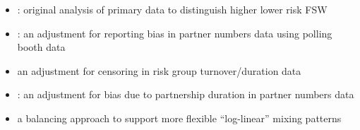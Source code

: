 \begin{itemize}
  \item{}:
  original analysis of primary data to distinguish higher \vs lower risk FSW
  \item{}:
  an adjustment for reporting bias in partner numbers data using polling booth data
  \item{}
  an adjustment for censoring in risk group turnover/duration data
  \item{}:
  an adjustment for bias due to partnership duration in partner numbers data
  \item{}
  a balancing approach to support more flexible ``log-linear'' mixing patterns \cite{Morris1991}
\end{itemize}
